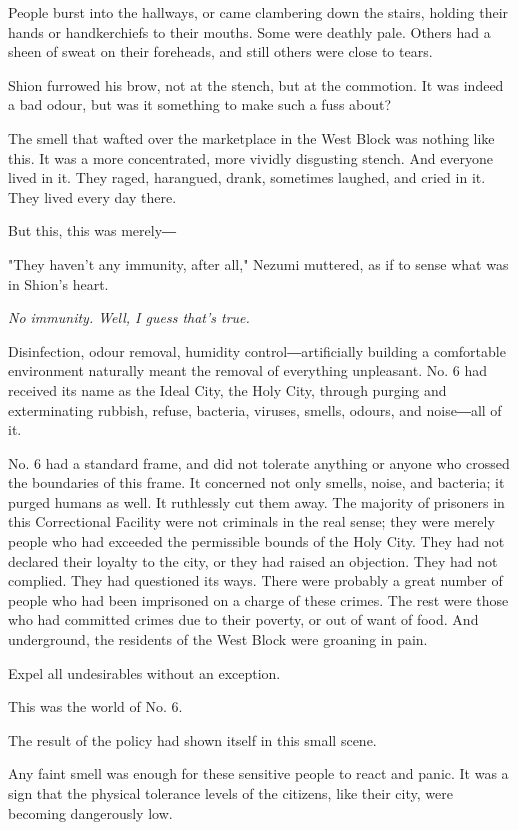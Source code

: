 People burst into the hallways, or came clambering down the stairs,
holding their hands or handkerchiefs to their mouths. Some were deathly
pale. Others had a sheen of sweat on their foreheads, and still others
were close to tears.

Shion furrowed his brow, not at the stench, but at the commotion. It was
indeed a bad odour, but was it something to make such a fuss about?

The smell that wafted over the marketplace in the West Block was nothing
like this. It was a more concentrated, more vividly disgusting stench.
And everyone lived in it. They raged, harangued, drank, sometimes
laughed, and cried in it. They lived every day there.

But this, this was merely―

"They haven't any immunity, after all," Nezumi muttered, as if to sense
what was in Shion's heart.

\emph{No immunity. Well, I guess that's true.}

Disinfection, odour removal, humidity control―artificially building a
comfortable environment naturally meant the removal of everything
unpleasant. No. 6 had received its name as the Ideal City, the Holy
City, through purging and exterminating rubbish, refuse, bacteria,
viruses, smells, odours, and noise―all of it.

No. 6 had a standard frame, and did not tolerate anything or anyone who
crossed the boundaries of this frame. It concerned not only smells,
noise, and bacteria; it purged humans as well. It ruthlessly cut them
away. The majority of prisoners in this Correctional Facility were not
criminals in the real sense; they were merely people who had exceeded
the permissible bounds of the Holy City. They had not declared their
loyalty to the city, or they had raised an objection. They had not
complied. They had questioned its ways. There were probably a great
number of people who had been imprisoned on a charge of these crimes.
The rest were those who had committed crimes due to their poverty, or
out of want of food. And underground, the residents of the West Block
were groaning in pain.

Expel all undesirables without an exception.

This was the world of No. 6.

The result of the policy had shown itself in this small scene.

Any faint smell was enough for these sensitive people to react and
panic. It was a sign that the physical tolerance levels of the citizens,
like their city, were becoming dangerously low.

